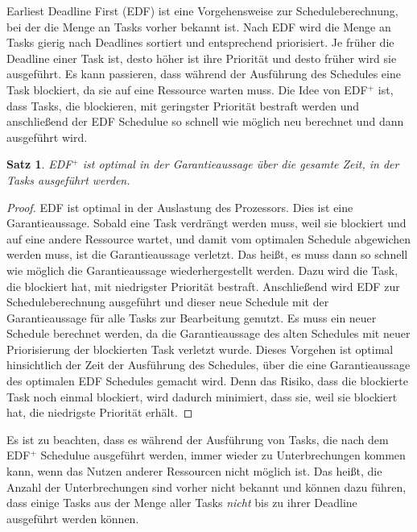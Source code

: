 \documentclass{scrarticle}
\newtheorem{satz}{Satz}[section]
\numberwithin{equation}{section}
\begin{document}
Earliest Deadline First (EDF) ist eine Vorgehensweise zur Scheduleberechnung, bei der die Menge an Tasks vorher bekannt ist. Nach EDF wird die Menge an Tasks gierig nach Deadlines sortiert und entsprechend priorisiert. Je früher die Deadline einer Task ist, desto höher ist ihre Priorität und desto früher wird sie ausgeführt. Es kann passieren, dass während der Ausführung des Schedules eine Task blockiert, da sie auf eine Ressource warten muss. Die Idee von EDF$^+$ ist, dass Tasks, die blockieren, mit geringster Priorität bestraft werden und anschließend der EDF Schedulue so schnell wie möglich neu berechnet und dann ausgeführt wird.
\begin{satz}
	EDF$^+$ ist optimal in der Garantieaussage über die gesamte Zeit, in der Tasks ausgeführt werden.
\end{satz}
\begin{proof}
	EDF ist optimal in der Auslastung des Prozessors. Dies ist eine Garantieaussage. Sobald eine Task verdrängt werden muss, weil sie blockiert und auf eine andere Ressource wartet, und damit vom optimalen Schedule abgewichen werden muss, ist die Garantieaussage verletzt. Das heißt, es muss dann so schnell wie möglich die Garantieaussage wiederhergestellt werden. Dazu wird die Task, die blockiert hat, mit niedrigster Priorität bestraft. Anschließend wird EDF zur Scheduleberechnung ausgeführt und dieser neue Schedule mit der Garantieaussage für alle Tasks zur Bearbeitung genutzt. Es muss ein neuer Schedule berechnet werden, da die Garantieaussage des alten Schedules mit neuer Priorisierung der blockierten Task verletzt wurde. Dieses Vorgehen ist optimal hinsichtlich der Zeit der Ausführung des Schedules, über die eine Garantieaussage des optimalen EDF Schedules gemacht wird. Denn das Risiko, dass die blockierte Task noch einmal blockiert, wird dadurch minimiert, dass sie, weil sie blockiert hat, die niedrigste Priorität erhält.
\end{proof}
Es ist zu beachten, dass es während der Ausführung von Tasks, die nach dem EDF$^+$ Schedulue ausgeführt werden, immer wieder zu Unterbrechungen kommen kann, wenn das Nutzen anderer Ressourcen nicht möglich ist. Das heißt, die Anzahl der Unterbrechungen sind vorher nicht bekannt und können dazu führen, dass einige Tasks aus der Menge aller Tasks \textit{nicht} bis zu ihrer Deadline ausgeführt werden können.
\end{document}
